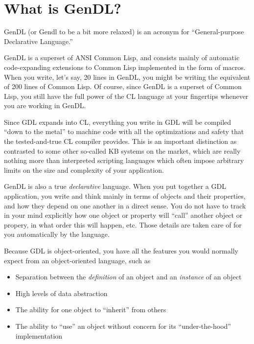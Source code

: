 \documentclass [11pt]{book}
\begin{document}
\section{What is GenDL?}

\label{sec:whatisgendl?}

GenDL (or Gendl to be a bit more relaxed) is an acronym for
``General-purpose Declarative Language.'' 

GenDL is a superset of ANSI Common Lisp, and consists mainly of
automatic code-expanding extensions to Common Lisp implemented in the
form of macros. When you write, let's say, 20 lines in GenDL, you
might be writing the equivalent of 200 lines of Common Lisp. Of
course, since GenDL is a superset of Common Lisp, you still have the
full power of the CL language at your fingertips whenever you are
working in GenDL.

Since GDL expands into CL, everything you write in GDL will be
compiled ``down to the metal'' to machine code with all the
optimizations and safety that the tested-and-true CL compiler
provides. This is an important distinction as contrasted to some other
so-called KB systems on the market, which are really nothing more than
interpreted scripting languages which often impose arbitrary limits on
the size and complexity of your application.

GenDL is also a true \emph{declarative} language. When you put together a GDL application, you write and think mainly
in terms of objects and their properties, and how they depend on one another in a direct
sense. You do not have to track in your mind explicitly how one object or property will ``call''
another object or propery, in what order this will happen, etc. Those details are
taken care of for you automatically by the language. 

Because GDL is object-oriented, you have all the features you would normally expect
from an object-oriented language, such as 

\begin{itemize}

\item Separation between the \emph{definition} of an object and an \emph{instance} of an object

\item High levels of data abstraction

\item The ability for one object to ``inherit'' from others

\item The ability to ``use'' an object without concern for its ``under-the-hood'' implementation

\end{itemize}
\end{document}
